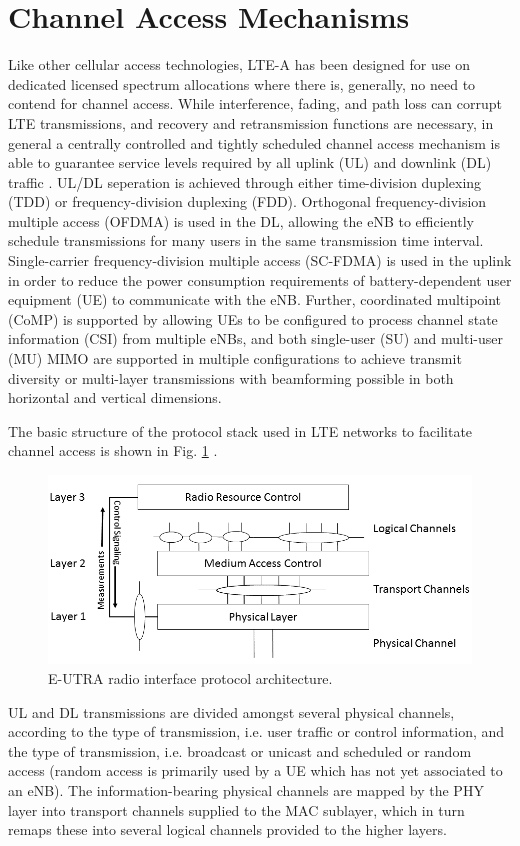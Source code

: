 \section{Channel Access Mechanisms}
\label{channel-access}
Like other cellular access technologies, LTE-A has been designed for use on dedicated licensed spectrum allocations where there is, generally, no need to contend for channel access.  While interference, fading, and path loss can corrupt LTE transmissions, and recovery and retransmission functions are necessary, in general a centrally controlled and tightly scheduled channel access mechanism is able to guarantee service levels required by all uplink (UL) and downlink (DL) traffic \cite{tr36300}. UL/DL seperation is achieved through either time-division duplexing (TDD) or frequency-division duplexing (FDD).  Orthogonal frequency-division multiple access (OFDMA) is used in the DL, allowing the eNB to efficiently schedule transmissions for many users in the same transmission time interval.  Single-carrier frequency-division multiple access (SC-FDMA) is used in the uplink in order to reduce the power consumption requirements of battery-dependent user equipment (UE) to communicate with the eNB.  Further, coordinated multipoint (CoMP) is supported by allowing UEs to be configured to process channel state information (CSI) from multiple eNBs, and both single-user (SU) and multi-user (MU) MIMO are supported in multiple configurations to achieve transmit diversity or multi-layer transmissions with beamforming possible in both horizontal and vertical dimensions.

The basic structure of the protocol stack used in LTE networks to facilitate channel access is shown in Fig. \ref{figs:stack} \cite{tr36201}.
\begin{figure}[!ht]	
	\includegraphics[width=\textwidth]{figures3/LTEradio-interface}
	\caption{E-UTRA radio interface protocol architecture.}
	\label{figs:stack}
\end{figure}
UL and DL transmissions are divided amongst several physical channels, according to the type of transmission, i.e. user traffic or control information, and the type of transmission, i.e. broadcast or unicast and scheduled or random access (random access is primarily used by a UE which has not yet associated to an eNB). The information-bearing physical channels are mapped by the PHY layer into transport channels supplied to the MAC sublayer, which in turn remaps these into several logical channels provided to the higher layers. 

